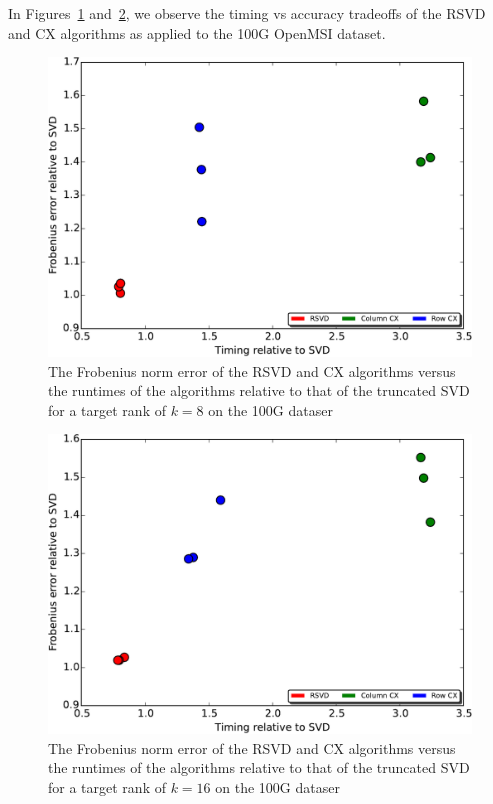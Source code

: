   In Figures~\ref{fig:timing-accuracy-8} and~\ref{fig:timing-accuracy-16}, we observe the timing vs accuracy tradeoffs of the RSVD and CX algorithms
  as applied to the 100G OpenMSI dataset. 

  \begin{figure}[h!btp]
    \begin{centering}
      \includegraphics[scale=0.4]{images/timing-accuracy-8}
      \end{centering}
      \caption{The Frobenius norm error of the RSVD and CX algorithms versus the runtimes of the algorithms relative to that of the truncated SVD
        for a target rank of $k=8$ on the 100G dataser}
    \label{fig:timing-accuracy-8}
  \end{figure}

  \begin{figure}[h!btp]
    \begin{centering}
      \includegraphics[scale=0.4]{images/timing-accuracy-16}
      \end{centering}
      \caption{The Frobenius norm error of the RSVD and CX algorithms versus the runtimes of the algorithms relative to that of the truncated SVD
        for a target rank of $k=16$ on the 100G dataser}
    \label{fig:timing-accuracy-16}
  \end{figure}


